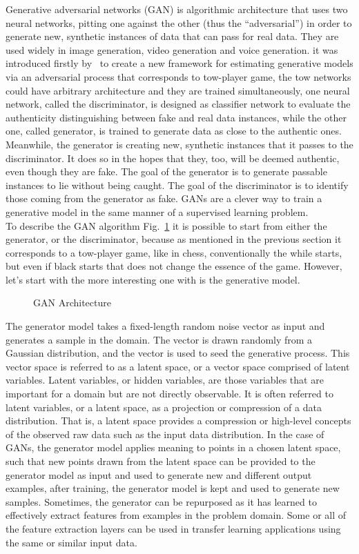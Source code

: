 \label{cha:GANs}
Generative adversarial networks (GAN) is algorithmic architecture that uses two neural networks, pitting one against the other (thus the “adversarial”) in order to generate new, synthetic instances of data that can pass for real data. They are used widely in image generation, video generation and voice generation. it was introduced firstly by~\cite{goodfellow2014generative} to create a new framework for estimating generative models via an adversarial process that corresponds to tow-player game,
the tow networks could have arbitrary architecture and they are trained simultaneously, one neural network, called the discriminator, is designed as classifier network to evaluate the authenticity  distinguishing between fake and real data instances, while the other one, called generator, is trained to generate data as close to the authentic ones. Meanwhile, the generator is creating new, synthetic instances that it passes to the discriminator. It does so in the hopes that they, too, will be deemed authentic, even though they are fake. The goal of the generator is to generate passable instances to lie without being caught. The goal of the discriminator is to identify those coming from the generator as fake. GANs are a clever way to train a generative model in the same manner of a supervised learning problem.\\
To describe the GAN algorithm Fig.~\ref{fig:GAN} it is possible to start from either the generator, or the discriminator, because as mentioned in the previous section it corresponds to a tow-player game, like in chess, conventionally the while starts, but even if black starts that does not change the essence of the game. However, let's start with the more interesting one with is the generative model.\\
\begin{figure}
	\centerline
	\GAN
	\caption{GAN Architecture}
	\label{fig:GAN}
\end{figure} 
The generator model takes a fixed-length random noise vector as input and generates a sample in the domain. The vector is drawn randomly from a Gaussian distribution, and the vector is used to seed the generative process. This vector space is referred to as a latent space, or a vector space comprised of latent variables. Latent variables, or hidden variables, are those variables that are important for a domain but are not directly observable. It is often referred to latent variables, or a latent space, as a projection or compression of a data distribution. That is, a latent space provides a compression or high-level concepts of the observed raw data such as the input data distribution. In the case of GANs, the generator model applies meaning to points in a chosen latent space, such that new points drawn from the latent space can be provided to the generator model as input and used to generate new and different output examples, 
after training, the generator model is kept and used to generate new samples. Sometimes, the generator can be repurposed as it has learned to effectively extract features from examples in the problem domain. Some or all of the feature extraction layers can be used in transfer learning applications using the same or similar input data. \\

